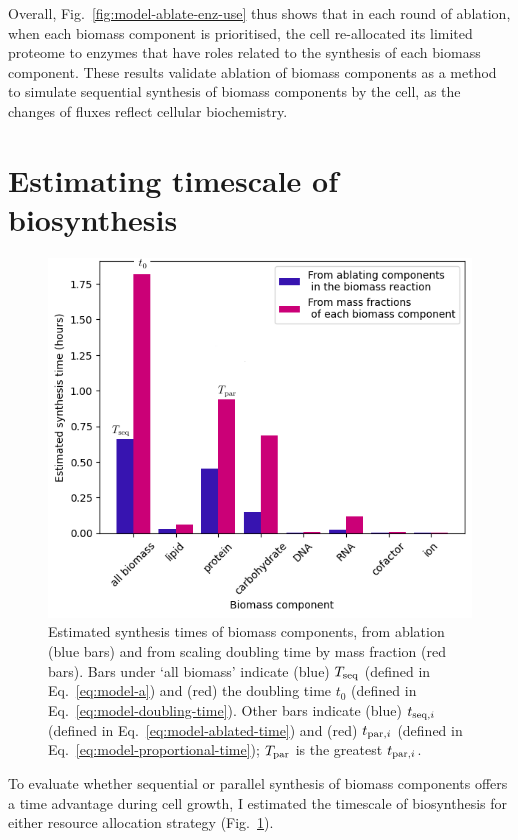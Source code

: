 Overall, Fig.\ \ref{fig:model-ablate-enz-use} thus shows that in each round of ablation, when each biomass component is prioritised, the cell re-allocated its limited proteome to enzymes that have roles related to the synthesis of each biomass component.
These results validate ablation of biomass components as a method to simulate sequential synthesis of biomass components by the cell, as the changes of fluxes reflect cellular biochemistry.


\section{Estimating timescale of biosynthesis}
\label{sec:model-timescale}

\begin{figure}
  \centering
  \includegraphics[width=.7\linewidth]{ablation_example_adapted.png}
  \caption{
    Estimated synthesis times of biomass components, from ablation (blue bars) and from scaling doubling time by mass fraction (red bars).
    Bars under `all biomass' indicate (blue) $T_{\mathrm{seq}}$ (defined in Eq.\ \ref{eq:model-a}) and (red) the doubling time $t_{0}$ (defined in Eq.\ \ref{eq:model-doubling-time}).
    Other bars indicate (blue) $t_{\mathrm{seq},i}$ (defined in Eq.\ \ref{eq:model-ablated-time}) and (red) $t_{\mathrm{par},i}$ (defined in Eq.\ \ref{eq:model-proportional-time}); $T_{\mathrm{par}}$ is the greatest $t_{\mathrm{par},i}$.
  }
  \label{fig:model-ablate-times}
\end{figure}


To evaluate whether sequential or parallel synthesis of biomass components offers a time advantage during cell growth, I estimated the timescale of biosynthesis for either resource allocation strategy (Fig.\ \ref{fig:model-ablate-times}).

